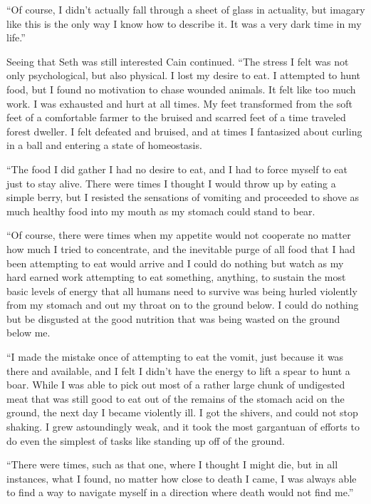 \documentclass[12pt,twoside,titlepage]{report}
\begin{document}
``Of course, I didn't actually fall through a sheet of glass in
actuality, but imagary like this is the only way I know how to describe
it. It was a very dark time in my life.''

Seeing that Seth was still interested Cain continued. ``The stress I
felt was not only psychological, but also physical. I lost my desire to
eat. I attempted to hunt food, but I found no motivation to chase
wounded animals. It felt like too much work. I was exhausted and hurt at
all times. My feet transformed from the soft feet of a comfortable
farmer to the bruised and scarred feet of a time traveled forest
dweller. I felt defeated and bruised, and at times I fantasized about
curling in a ball and entering a state of homeostasis.

``The food I did gather I had no desire to eat, and I had to force
myself to eat just to stay alive. There were times I thought I would
throw up by eating a simple berry, but I resisted the sensations of
vomiting and proceeded to shove as much healthy food into my mouth as my
stomach could stand to bear.

``Of course, there were times when my appetite would not cooperate no
matter how much I tried to concentrate, and the inevitable purge of all
food that I had been attempting to eat would arrive and I could do
nothing but watch as my hard earned work attempting to eat something,
anything, to sustain the most basic levels of energy that all humans
need to survive was being hurled violently from my stomach and out my
throat on to the ground below. I could do nothing but be disgusted at
the good nutrition that was being wasted on the ground below me.

``I made the mistake once of attempting to eat the vomit, just because
it was there and available, and I felt I didn't have the energy to lift
a spear to hunt a boar. While I was able to pick out most of a rather
large chunk of undigested meat that was still good to eat out of the
remains of the stomach acid on the ground, the next day I became
violently ill. I got the shivers, and could not stop shaking. I grew
astoundingly weak, and it took the most gargantuan of efforts to do even
the simplest of tasks like standing up off of the ground.

``There were times, such as that one, where I thought I might die, but
in all instances, what I found, no matter how close to death I came, I
was always able to find a way to navigate myself in a direction where
death would not find me.''
\end{document}
